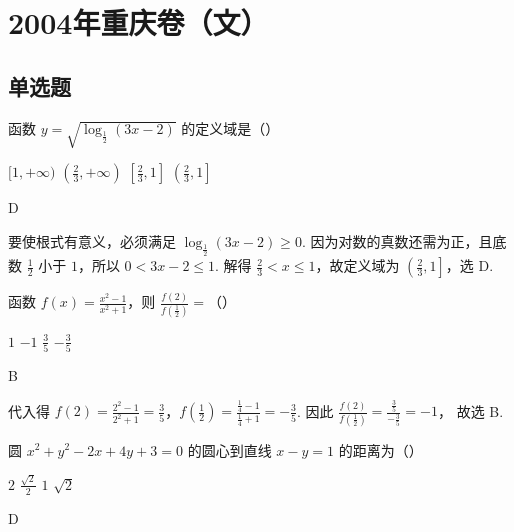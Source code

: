 \chapter{2004年重庆卷（文）}
\section{单选题}
\begin{problem}
函数 \( y = \sqrt{\log_{\frac{1}{2}}(3x - 2)} \) 的定义域是（\quad）

\choices
    {\([1, +\infty)\)}
    {\(\left(\frac{2}{3}, +\infty\right)\)}
    {\(\left[\frac{2}{3}, 1\right]\)}
    {\(\left(\frac{2}{3}, 1\right]\)}
\end{problem}

\begin{answer}
D
\end{answer}

\begin{solution}
要使根式有意义，必须满足 \(\log_{\frac{1}{2}}(3x-2)\geqslant0\). 因为对数的真数还需为正，且底数 \(\frac{1}{2}\) 小于 \(1\)，所以 \(0<3x-2\leqslant1\).
解得 \(\frac{2}{3}<x\leqslant1\)，故定义域为 \(\left(\frac{2}{3},1\right]\)，选 D.
\end{solution}

\begin{problem}
函数 \( f(x) = \frac{x^2 - 1}{x^2 + 1} \)，则 \( \frac{f(2)}{f\left(\frac{1}{2}\right)} = \)（\quad）

\choices
    {\(1\)}
    {\(-1\)}
    {\(\frac{3}{5}\)}
    {\(-\frac{3}{5}\)}
\end{problem}

\begin{answer}
B
\end{answer}

\begin{solution}
代入得 \(f(2)=\frac{2^2-1}{2^2+1}=\frac{3}{5}\)，\(f\left(\frac{1}{2}\right)=\frac{\frac{1}{4}-1}{\frac{1}{4}+1}=-\frac{3}{5}\). 因此 \(\frac{f(2)}{f\left(\frac{1}{2}\right)}=\frac{\frac{3}{5}}{-\frac{3}{5}}=-1\)，
故选 B.
\end{solution}

\begin{problem}
圆 \(x^{2} + y^{2} - 2x + 4y + 3 = 0\) 的圆心到直线 \(x - y = 1\) 的距离为（\quad）

\choices
    {\(2\)}
    {\(\frac{\sqrt{2}}{2}\)}
    {\(1\)}
    {\(\sqrt{2}\)}
\end{problem}

\begin{answer}
D
\end{answer}

